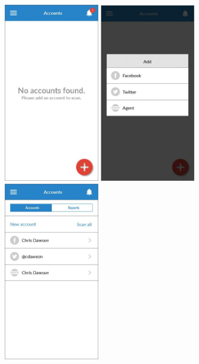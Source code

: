 \begin{figure}
  \subfigures
  \centering
  \begin{minipage}{4.6cm}
    \centering
    \includegraphics[width=4.2cm]{inc/ui_addacc_step1.jpg}
    \caption{}
    \label{fig:ui_addacc_step1}
  \end{minipage}
  \begin{minipage}{4.6cm}
    \centering
    \includegraphics[width=4.2cm]{inc/ui_addacc_step2.jpg}
    \caption{}
    \label{fig:ui_addacc_step2}
  \end{minipage}
  \begin{minipage}{4.6cm}
    \centering
    \includegraphics[width=4.2cm]{inc/ui_addacc_step3.jpg}
    \caption{}
    \label{fig:ui_addacc_step3}
  \end{minipage}
\end{figure}

